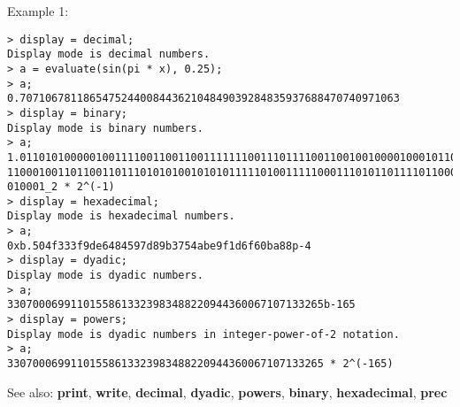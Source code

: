 \noindent Example 1: 
\begin{center}\begin{minipage}{15cm}\begin{Verbatim}[frame=single]
> display = decimal;
Display mode is decimal numbers.
> a = evaluate(sin(pi * x), 0.25);
> a;
0.707106781186547524400844362104849039284835937688470740971063
> display = binary;
Display mode is binary numbers.
> a;
1.011010100000100111100110011001111111001110111100110010010000100010110010111110
11000100110110011011101010100101010111110100111110001110101101111011000001011101
010001_2 * 2^(-1)
> display = hexadecimal;
Display mode is hexadecimal numbers.
> a;
0xb.504f333f9de6484597d89b3754abe9f1d6f60ba88p-4
> display = dyadic;
Display mode is dyadic numbers.
> a;
33070006991101558613323983488220944360067107133265b-165
> display = powers;
Display mode is dyadic numbers in integer-power-of-2 notation.
> a;
33070006991101558613323983488220944360067107133265 * 2^(-165)
\end{Verbatim}
\end{minipage}\end{center}
See also: \textbf{print}, \textbf{write}, \textbf{decimal}, \textbf{dyadic}, \textbf{powers}, \textbf{binary}, \textbf{hexadecimal}, \textbf{prec}

